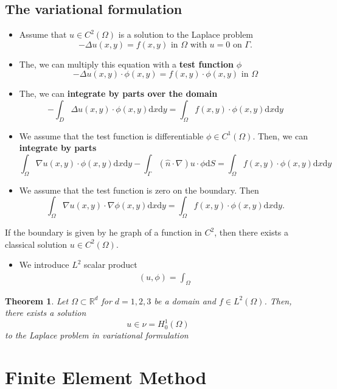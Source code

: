 \documentclass[openany]{memoir}
\theoremstyle{defintion}
\newtheorem{theorem}{Theorem}
\begin{document}
\section{The variational formulation}

\begin{itemize}
\item Assume that $u\in C^2(\Omega)$ is a solution to the Laplace problem \[-\Delta u(x,y)=f(x,y) \text{ in }\Omega\text{ with }u=0\text{ on }\Gamma. \]
 
\item The, we can multiply this equation with a \textbf{test function} $\phi$ \[ -\Delta u(x,y)\cdot \phi(x,y)=f(x,y)\cdot\phi(x,y)\text{ in }\Omega \]

  
\item The, we can \textbf{integrate by parts over the domain} \[-\int_{D}\Delta u(x,y)\cdot\phi(x,y)\mathrm{d}x\mathrm{d}y=\int_{\Omega}f(x,y)\cdot\phi(x,y)\mathrm{d}x\mathrm{d}y \]
\item We assume that the test function is differentiable $\phi\in C^1(\Omega)$. Then, we can \textbf{integrate by parts} \[\int_{\Omega}\nabla u(x,y)\cdot\phi(x,y)\mathrm{d}x\mathrm{d}y-\int_\Gamma(\hat{n}\cdot\nabla)u\cdot\phi\mathrm{d}S=\int_{\Omega}f(x,y)\cdot\phi(x,y)\mathrm{d}x\mathrm{d}y \]
\item We assume that the test function is zero on the boundary. Then \[\int_\Omega\nabla u(x,y)\cdot\nabla\phi(x,y)\mathrm{d}x\mathrm{d}y=\int_\Omega f(x,y)\cdot\phi(x,y)\mathrm{d}x\mathrm{d}y. \]

\end{itemize}

If the boundary is given by he graph of a function in $C^2$, then there exists a classical solution $u\in C^2(\Omega)$.

\begin{itemize}
\item We introduce $L^2$ scalar product
  \begin{align*}
    (u,\phi)=\int_\Omega 
  \end{align*}
\end{itemize}

\begin{theorem}
Let $\Omega\subset\mathbb{R}^d$ for $d=1,2,3$ be a domain and $f\in L^2(\Omega)$. Then, there exists a solution \[ u\in\nu = H^1_0(\Omega) \] to the \textit{Laplace problem} in variational formulation
\end{theorem}

\chapter{Finite Element Method}
\end{document}
